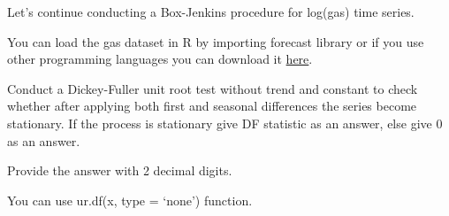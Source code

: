 
\begin{question}
Let's continue conducting a Box-Jenkins procedure for log(gas) time series.

You can load the gas dataset in R by importing forecast library or if you use other programming languages you can download it \href{https://github.com/vincentarelbundock/Rdatasets/blob/master/csv/forecast/gas.csv}{here}.

Conduct a Dickey-Fuller unit root test without trend and constant to check whether after applying both first and seasonal differences the series become stationary.
If the process is stationary give DF statistic as an answer, else give 0 as an answer.

Provide the answer with 2 decimal digits.
\end{question}

\begin{solution}
You can use ur.df(x, type = `none') function.
\end{solution}

